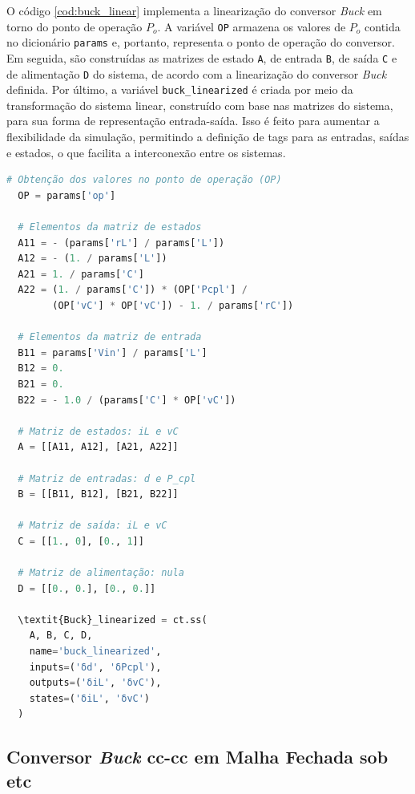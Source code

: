 O código \ref{cod:buck_linear} implementa a linearização do conversor \textit{Buck} em torno do ponto de operação $P_o$. A variável \texttt{OP} armazena os valores de $P_o$ contida no dicionário \texttt{params} e, portanto, representa o ponto de operação do conversor. Em seguida, são construídas as matrizes de estado \texttt{A}, de entrada \texttt{B}, de saída \texttt{C} e de alimentação \texttt{D} do sistema, de acordo com a linearização do conversor \textit{Buck} definida. Por último, a variável \texttt{buck\_linearized} é criada por meio da transformação do sistema linear, construído com base nas matrizes do sistema, para sua forma de representação entrada-saída. Isso é feito para aumentar a flexibilidade da simulação, permitindo a definição de tags para as entradas, saídas e estados, o que facilita a interconexão entre os sistemas.

\vspace{8pt}
\begin{lstlisting}[language=Python, caption={Implementação do conversor \textit{Buck} linearizado.}, label=cod:buck_linear]
  # Obtenção dos valores no ponto de operação (OP)
  OP = params['op']

  # Elementos da matriz de estados
  A11 = - (params['rL'] / params['L'])
  A12 = - (1. / params['L'])
  A21 = 1. / params['C']
  A22 = (1. / params['C']) * (OP['Pcpl'] /
        (OP['vC'] * OP['vC']) - 1. / params['rC'])

  # Elementos da matriz de entrada
  B11 = params['Vin'] / params['L']
  B12 = 0.
  B21 = 0.
  B22 = - 1.0 / (params['C'] * OP['vC'])

  # Matriz de estados: iL e vC
  A = [[A11, A12], [A21, A22]]

  # Matriz de entradas: d e P_cpl
  B = [[B11, B12], [B21, B22]]

  # Matriz de saída: iL e vC
  C = [[1., 0], [0., 1]]

  # Matriz de alimentação: nula
  D = [[0., 0.], [0., 0.]]

  \textit{Buck}_linearized = ct.ss(
    A, B, C, D,
    name='buck_linearized',
    inputs=('δd', 'δPcpl'),
    outputs=('δiL', 'δvC'),
    states=('δiL', 'δvC')
  )
\end{lstlisting}

\subsection{Conversor \textit{Buck} \acrshort{cc}-\acrshort{cc} em Malha Fechada sob \acrshort{etc}}

